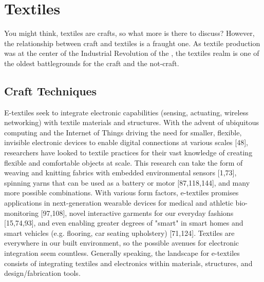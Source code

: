 \section{Textiles}

You might think, textiles are crafts, so what more is there to discuss? However, the relationship between craft and textiles is a fraught one. As textile production was at the center of the Industrial Revolution of the \todo{[dates]}, the textiles realm is one of the oldest battlegrounds for the craft and the not-craft. 

\subsection{Craft Techniques}

E-textiles seek to integrate electronic capabilities (sensing, actuating, wireless networking) with textile materials and structures. With the advent of ubiquitous computing and the Internet of Things driving the need for smaller, flexible, invisible electronic devices to enable digital connections at various scales [48], researchers have looked to textile practices for their vast knowledge of creating flexible and comfortable objects at scale. This research can take the form of weaving and knitting fabrics with embedded environmental sensors [1,73], spinning yarns that can be used as a battery or motor [87,118,144], and many more possible combinations. With various form factors, e-textiles promises applications in next-generation wearable devices for medical and athletic bio-monitoring [97,108], novel interactive garments for our everyday fashions [15,74,93], and even enabling greater degrees of "smart" in smart homes and smart vehicles (e.g. flooring, car seating upholstery) [71,124]. Textiles are everywhere in our built environment, so the possible avenues for electronic integration seem countless. Generally speaking, the landscape for e-textiles consists of integrating textiles and electronics within materials, structures, and design/fabrication tools.


